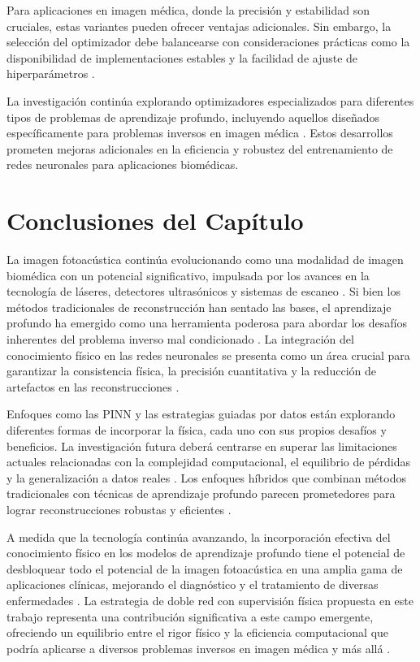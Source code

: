 Para aplicaciones en imagen médica, donde la precisión y estabilidad son cruciales, estas variantes pueden ofrecer ventajas adicionales. Sin embargo, la selección del optimizador debe balancearse con consideraciones prácticas como la disponibilidad de implementaciones estables y la facilidad de ajuste de hiperparámetros \cite{schmidt2021descending}.

La investigación continúa explorando optimizadores especializados para diferentes tipos de problemas de aprendizaje profundo, incluyendo aquellos diseñados específicamente para problemas inversos en imagen médica \cite{bottou2018optimization}. Estos desarrollos prometen mejoras adicionales en la eficiencia y robustez del entrenamiento de redes neuronales para aplicaciones biomédicas.

\section{Conclusiones del Capítulo}

La imagen fotoacústica continúa evolucionando como una modalidad de imagen biomédica con un potencial significativo, impulsada por los avances en la tecnología de láseres, detectores ultrasónicos y sistemas de escaneo \cite{recent_advances_2025a, park_2024}. Si bien los métodos tradicionales de reconstrucción han sentado las bases, el aprendizaje profundo ha emergido como una herramienta poderosa para abordar los desafíos inherentes del problema inverso mal condicionado \cite{photoacoustic_deep_learning_review_2022, recent_advances_dl_2023}. La integración del conocimiento físico en las redes neuronales se presenta como un área crucial para garantizar la consistencia física, la precisión cuantitativa y la reducción de artefactos en las reconstrucciones \cite{hauptmann_2024}.

Enfoques como las PINN \cite{understanding_pinns_2024} y las estrategias guiadas por datos \cite{enhanced_pam_2024} están explorando diferentes formas de incorporar la física, cada uno con sus propios desafíos y beneficios. La investigación futura deberá centrarse en superar las limitaciones actuales relacionadas con la complejidad computacional, el equilibrio de pérdidas y la generalización a datos reales \cite{pinns_medical_2024, hauptmann_2024}. Los enfoques híbridos que combinan métodos tradicionales con técnicas de aprendizaje profundo parecen prometedores para lograr reconstrucciones robustas y eficientes \cite{hybrid_neural_network_2020, hybrid_reconstruction_2024}.

A medida que la tecnología continúa avanzando, la incorporación efectiva del conocimiento físico en los modelos de aprendizaje profundo tiene el potencial de desbloquear todo el potencial de la imagen fotoacústica en una amplia gama de aplicaciones clínicas, mejorando el diagnóstico y el tratamiento de diversas enfermedades \cite{deep_learning_bilab_2024, dual_modal_2024}. La estrategia de doble red con supervisión física propuesta en este trabajo representa una contribución significativa a este campo emergente, ofreciendo un equilibrio entre el rigor físico y la eficiencia computacional que podría aplicarse a diversos problemas inversos en imagen médica y más allá \cite{resolution_enhancement_2024, hybrid_reconstruction_2024}.